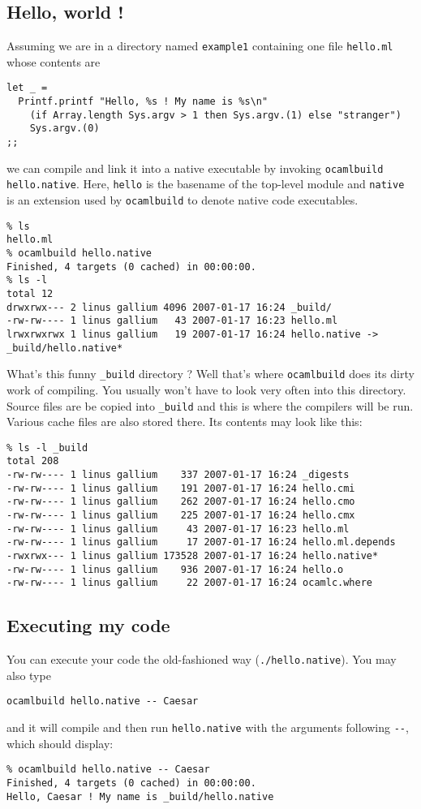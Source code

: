 \documentclass[9pt]{article}
\newcommand{\ocb}{\texttt{ocamlbuild}\xspace}
\begin{document}
\subsection{Hello, world !}
Assuming we are in a directory named \texttt{example1} containing one file \texttt{hello.ml}
whose contents are
\begin{verbatim}
let _ =
  Printf.printf "Hello, %s ! My name is %s\n"
    (if Array.length Sys.argv > 1 then Sys.argv.(1) else "stranger")
    Sys.argv.(0)
;;
\end{verbatim}
we can compile and link it into a native executable by invoking \texttt{ocamlbuild hello.native}.
Here, \texttt{hello} is the basename of the top-level module and \texttt{native} is an extension used
by \ocb to denote native code executables.
\begin{verbatim}
% ls
hello.ml
% ocamlbuild hello.native        
Finished, 4 targets (0 cached) in 00:00:00.
% ls -l
total 12
drwxrwx--- 2 linus gallium 4096 2007-01-17 16:24 _build/
-rw-rw---- 1 linus gallium   43 2007-01-17 16:23 hello.ml
lrwxrwxrwx 1 linus gallium   19 2007-01-17 16:24 hello.native -> _build/hello.native*
\end{verbatim}
What's this funny \texttt{\_build} directory ?  Well that's where \ocb does its dirty work
of compiling.  You usually won't have to look very often into this directory.  Source files are be copied
into \texttt{\_build} and this is where the compilers will be run.  Various cache files are also stored
there.  Its contents may look like this:
\begin{verbatim}
% ls -l _build 
total 208
-rw-rw---- 1 linus gallium    337 2007-01-17 16:24 _digests
-rw-rw---- 1 linus gallium    191 2007-01-17 16:24 hello.cmi
-rw-rw---- 1 linus gallium    262 2007-01-17 16:24 hello.cmo
-rw-rw---- 1 linus gallium    225 2007-01-17 16:24 hello.cmx
-rw-rw---- 1 linus gallium     43 2007-01-17 16:23 hello.ml
-rw-rw---- 1 linus gallium     17 2007-01-17 16:24 hello.ml.depends
-rwxrwx--- 1 linus gallium 173528 2007-01-17 16:24 hello.native*
-rw-rw---- 1 linus gallium    936 2007-01-17 16:24 hello.o
-rw-rw---- 1 linus gallium     22 2007-01-17 16:24 ocamlc.where
\end{verbatim}
\subsection{Executing my code}
You can execute your code the old-fashioned way (\texttt{./hello.native}).
You may also type
\begin{verbatim}
ocamlbuild hello.native -- Caesar
\end{verbatim}
and it will compile and then run \texttt{hello.native} with the arguments following \texttt{-{}-},
which should display:
\begin{verbatim}
% ocamlbuild hello.native -- Caesar   
Finished, 4 targets (0 cached) in 00:00:00.
Hello, Caesar ! My name is _build/hello.native
\end{verbatim}
\end{document}
